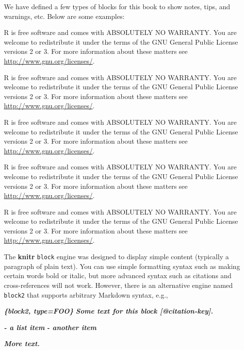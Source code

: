 \documentclass[
  12pt,
]{krantz}
\makeatletter
\newenvironment{Shaded}{\begin{snugshade}}{\end{snugshade}}
\newcommand{\InformationTok}[1]{\textcolor[rgb]{0.56,0.35,0.01}{\textbf{\textit{#1}}}}
\newenvironment{kframe}{%
\medskip{}
\setlength{\fboxsep}{.8em}
 \def\at@end@of@kframe{}%
 \ifinner\ifhmode%
  \def\at@end@of@kframe{\end{minipage}}%
  \begin{minipage}{\columnwidth}%
 \fi\fi%
 \def\FrameCommand##1{\hskip\@totalleftmargin \hskip-\fboxsep
 \colorbox{shadecolor}{##1}\hskip-\fboxsep
     \hskip-\linewidth \hskip-\@totalleftmargin \hskip\columnwidth}%
 \MakeFramed {\advance\hsize-\width
   \@totalleftmargin\z@ \linewidth\hsize
   \@setminipage}}%
 {\par\unskip\endMakeFramed%
 \at@end@of@kframe}
\newenvironment{rmdblock}[1]
  {
  \begin{itemize}
  \renewcommand{\labelitemi}{
    \raisebox{-.7\height}[0pt][0pt]{
      {\setkeys{Gin}{width=3em,keepaspectratio}\texttt{[image: images/\#1]}}
    }
  }
  \setlength{\fboxsep}{1em}
  \begin{kframe}
  \item
  }
  {
  \end{kframe}
  \end{itemize}
  }
\newenvironment{rmdnote}
  {\begin{rmdblock}{note}}
  {\end{rmdblock}}
\newenvironment{rmdcaution}
  {\begin{rmdblock}{caution}}
  {\end{rmdblock}}
\newenvironment{rmdimportant}
  {\begin{rmdblock}{important}}
  {\end{rmdblock}}
\newenvironment{rmdtip}
  {\begin{rmdblock}{tip}}
  {\end{rmdblock}}
\newenvironment{rmdwarning}
  {\begin{rmdblock}{warning}}
  {\end{rmdblock}}
\theoremstyle{definition}
\theoremstyle{definition}
\theoremstyle{definition}
\theoremstyle{definition}
\theoremstyle{remark}
\makeatother
\begin{document}
We have defined a few types of blocks for this book to show notes, tips, and warnings, etc. Below are some examples:

\begin{rmdnote}
R is free software and comes with ABSOLUTELY NO WARRANTY.
You are welcome to redistribute it under the terms of the
GNU General Public License versions 2 or 3.
For more information about these matters see
\url{http://www.gnu.org/licenses/}.
\end{rmdnote}

\begin{rmdcaution}
R is free software and comes with ABSOLUTELY NO WARRANTY.
You are welcome to redistribute it under the terms of the
GNU General Public License versions 2 or 3.
For more information about these matters see
\url{http://www.gnu.org/licenses/}.
\end{rmdcaution}

\begin{rmdimportant}
R is free software and comes with ABSOLUTELY NO WARRANTY.
You are welcome to redistribute it under the terms of the
GNU General Public License versions 2 or 3.
For more information about these matters see
\url{http://www.gnu.org/licenses/}.
\end{rmdimportant}

\begin{rmdtip}
R is free software and comes with ABSOLUTELY NO WARRANTY.
You are welcome to redistribute it under the terms of the
GNU General Public License versions 2 or 3.
For more information about these matters see
\url{http://www.gnu.org/licenses/}.
\end{rmdtip}

\begin{rmdwarning}
R is free software and comes with ABSOLUTELY NO WARRANTY.
You are welcome to redistribute it under the terms of the
GNU General Public License versions 2 or 3.
For more information about these matters see
\url{http://www.gnu.org/licenses/}.
\end{rmdwarning}

The \textbf{knitr} \texttt{block} engine was designed to display simple content (typically a paragraph of plain text). You can use simple formatting syntax such as making certain words bold or italic, but more advanced syntax such as citations and cross-references will not work. However, there is an alternative engine named \texttt{block2} that supports arbitrary Markdown syntax, e.g.,

\begin{Shaded}
\begin{Highlighting}[]
\InformationTok{\textasciigrave{}\textasciigrave{}\textasciigrave{}\{block2, type=\textquotesingle{}FOO\textquotesingle{}\}}
\InformationTok{Some text for this block [@citation{-}key].}

\InformationTok{{-} a list item}
\InformationTok{{-} another item}

\InformationTok{More text.}
\InformationTok{\textasciigrave{}\textasciigrave{}\textasciigrave{}}
\end{Highlighting}
\end{Shaded}
\end{document}
